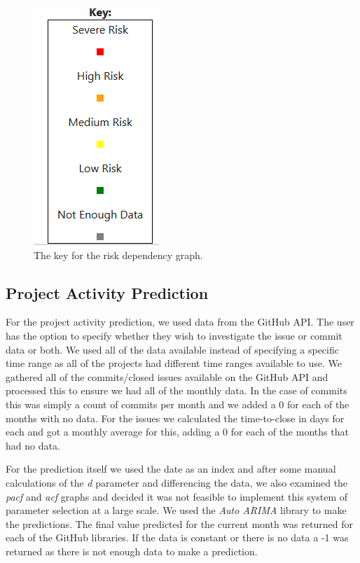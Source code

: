 \documentclass[conference]{IEEEtran}
\begin{document}
\begin{figure}[H]
\begin{center}
    \includegraphics[scale=0.5]{Key.png}
    \caption{The key for the risk dependency graph.}
    \label{fig:key}
\end{center}
\end{figure}


\subsection{Project Activity Prediction}
For the project activity prediction, we used data from the GitHub API. The user has the option to specify whether they wish to investigate the issue or commit data or both. We used all of the data available instead of specifying a specific time range as all of the projects had different time ranges available to use. We gathered all of the commits/closed issues available on the GitHub API and processed this to ensure we had all of the monthly data. In the case of commits this was simply a count of commits per month and we added a 0 for each of the months with no data. For the issues we calculated the time-to-close in days for each and got a monthly average for this, adding a 0 for each of the months that had no data. 

For the prediction itself we used the date as an index and after some manual calculations of the \textit{d} parameter and differencing the data, we also examined the \textit{pacf} and \textit{acf} graphs and decided it was not feasible to implement this system of parameter selection at a large scale. We used the \textit{Auto ARIMA} library to make the predictions. The final value predicted for the current month was returned for each of the GitHub libraries. If the data is constant or there is no data a -1 was returned as there is not enough data to make a prediction. 
\end{document}
